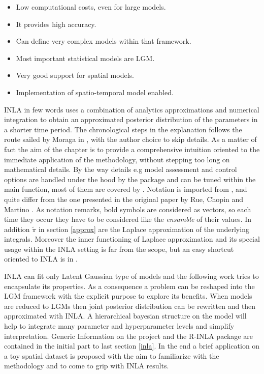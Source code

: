 \documentclass[
  12pt,
  a4paper,
  oneside]{book}
\providecommand{\tightlist}{%
  \setlength{\itemsep}{0pt}\setlength{\parskip}{0pt}}
\theoremstyle{definition}
\theoremstyle{definition}
\theoremstyle{definition}
\theoremstyle{remark}
\begin{document}
\begin{itemize}
\tightlist
\item
  Low computational costs, even for large models.
\item
  It provides high accuracy.
\item
  Can define very complex models within that framework.
\item
  Most important statistical models are LGM.
\item
  Very good support for spatial models.
\item
  Implementation of spatio-temporal model enabled.
\end{itemize}

INLA in few words uses a combination of analytics approximations and numerical integration to obtain an approximated posterior distribution of the parameters in a shorter time period.
The chronological steps in the explanation follows the route sailed by Moraga in \citet{Moraga2019}, with the author choice to skip details. As a matter of fact the aim of the chapter is to provide a comprehensive intuition oriented to the immediate application of the methodology, without stepping too long on mathematical details. By the way details e.g model assessment and control options are handled under the hood by the package and can be tuned within the main function, most of them are covered by \citet{Bayesian_INLA_Rubio}. Notation is imported from \citet{Blangiardo-Cameletti}, and quite differ from the one presented in the original paper by Rue, Chopin and Martino \citeyearpar{Rue2009}. As notation remarks, bold symbols are considered as vectors, so each time they occur they have to be considered like the \emph{ensamble} of their values. In addition \(\tilde\pi\) in section \ref{approx} are the Laplace approximation of the underlying integrals. Moreover the inner functioning of Laplace approximation and its special usage within the INLA setting is far from the scope, but an easy shortcut oriented to INLA is in \citet{Blangiardo-Cameletti}.

INLA can fit only Latent Gaussian type of models and the following work tries to encapsulate its properties. As a consequence a problem can be reshaped into the LGM framework with the explicit purpose to explore its benefits. When models are reduced to LGMs then joint posterior distribution can be rewritten and then approximated with INLA. A hierarchical bayesian structure on the model will help to integrate many parameter and hyperparameter levels and simplify interpretation.
Generic Information on the project and the R-INLA package are contained in the initial part to last section \ref{inla}. In the end a brief application on a toy spatial dataset is proposed with the aim to familiarize with the methodology and to come to grip with INLA results.
\end{document}
